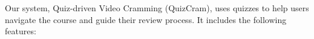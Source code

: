 \documentclass{chi-ext}
\begin{document}



Our system, Quiz-driven Video Cramming (QuizCram), uses quizzes to help users navigate the course and guide their review process. It includes the following features:
\end{document}
